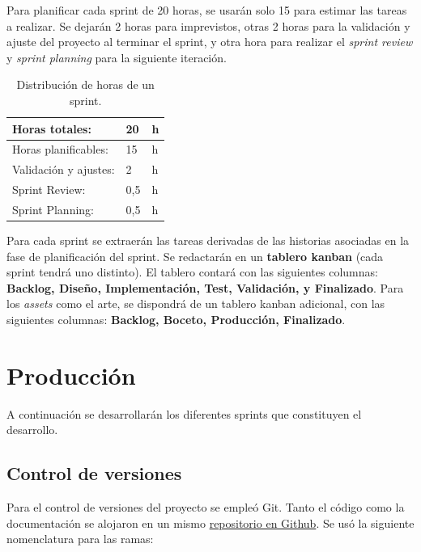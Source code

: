 Para planificar cada sprint de 20 horas, se usarán solo 15 para estimar las tareas a realizar. Se dejarán 2 horas para imprevistos, otras 2 horas para la validación y ajuste del proyecto al terminar el sprint, y otra hora para realizar el \textit{sprint review} y \textit{sprint planning} para la siguiente iteración.

\begin{table}[!ht]
    \centering
    \begin{tabular}{|l|l|l|}
    \hline
        Horas totales: & 20 & h \\ \hline
        Horas planificables: & 15 & h \\ \hline
        Validación y ajustes: & 2 & h \\ \hline
        Sprint Review: & 0,5 & h \\ \hline
        Sprint Planning: & 0,5 & h \\ \hline
    \end{tabular}
    \caption{Distribución de horas de un sprint.}
\end{table} 

Para cada sprint se extraerán las tareas derivadas de las historias asociadas en la fase de planificación del sprint. Se redactarán en un \textbf{tablero kanban} (cada sprint tendrá uno distinto). El tablero contará con las siguientes columnas: \textbf{Backlog, Diseño, Implementación, Test, Validación, y Finalizado}. Para los \textit{assets} como el arte, se dispondrá de un tablero kanban adicional, con las siguientes columnas: \textbf{Backlog, Boceto, Producción, Finalizado}.

\section{Producción}

A continuación se desarrollarán los diferentes sprints que constituyen el desarrollo.

\subsection{Control de versiones}

Para el control de versiones del proyecto se empleó Git. Tanto el código como la documentación se alojaron en un mismo \href{https://github.com/pabloMillanCb/tfm}{repositorio en Github}. Se usó la siguiente nomenclatura para las ramas:

